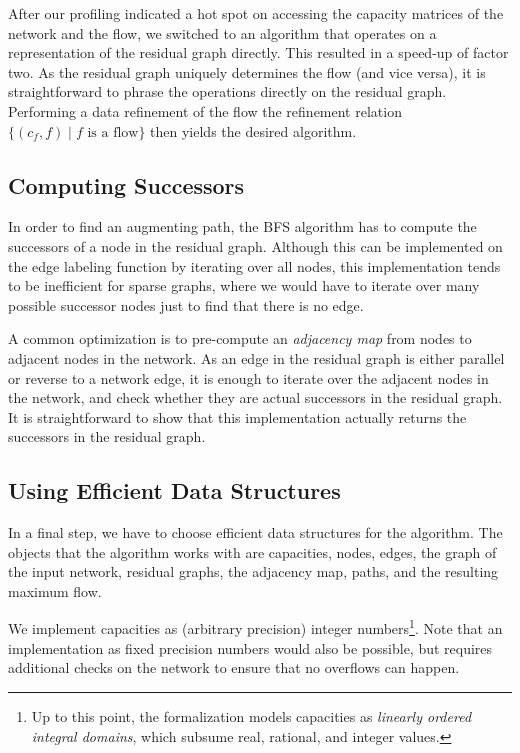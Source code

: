 \documentclass{llncs}
\begin{document}
  After our profiling indicated a hot spot on accessing the capacity matrices of the network and the flow, we switched to 
  an algorithm that operates on a representation of the residual graph directly. This resulted in a speed-up of factor two.
  As the residual graph uniquely determines the flow (and vice versa), it is straightforward to phrase the
  operations directly on the residual graph. Performing a data refinement of the flow \wrt the refinement 
  relation $\{(c_f,f) \mid \text{$f$ is a flow}\}$ then yields the desired algorithm.
      
  \subsection{Computing Successors}
  In order to find an augmenting path, the BFS algorithm has to compute the successors of a node in the residual graph. 
  Although this can be implemented on the edge labeling function by iterating over all nodes, this implementation tends to be inefficient for sparse graphs,
  where we would have to iterate over many possible successor nodes just to find that there is no edge. 
  
  A common optimization is to pre-compute an \emph{adjacency map} from nodes to adjacent nodes in the network. 
  As an edge in the residual graph is either parallel or reverse to 
  a network edge, it is enough to iterate over the adjacent nodes in the network, and check whether they are actual successors in the residual graph.
  It is straightforward to show that this implementation actually returns the successors in the residual graph.

  \subsection{Using Efficient Data Structures}\label{sec:impl_data_structures}
  In a final step, we have to choose efficient data structures for the algorithm. The objects that the algorithm works with are
  capacities, nodes, edges, the graph of the input network, residual graphs, the adjacency map, paths, and the resulting maximum flow. 
  
  We implement capacities as (arbitrary precision) integer numbers\footnote{Up to this point, the formalization models capacities as \emph{linearly ordered integral domains}, which subsume real, rational, and integer values.}. Note that an implementation as fixed precision numbers would also be possible,
  but requires additional checks on the network to ensure that no overflows can happen. 
  
\end{document}
